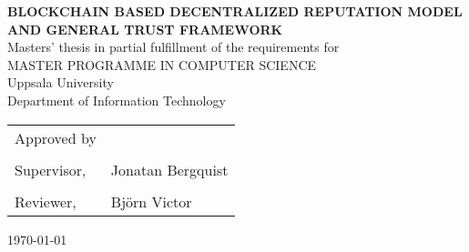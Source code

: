 
\thispagestyle{empty}

\vspace*{+5em}
\begin{center}
\textbf{BLOCKCHAIN BASED DECENTRALIZED REPUTATION MODEL AND GENERAL TRUST FRAMEWORK}\\
\vspace*{+4em}
Masters' thesis in partial fulfillment of the requirements for \\
\vspace{+2em}
MASTER PROGRAMME IN COMPUTER SCIENCE\\

\vspace*{+3em}
Uppsala University\\
Department of Information Technology\\
\vspace*{+2em}

\end{center}

\begin{tabular}{ l l }
 Approved by &   \\
  & \\
  Supervisor, & Jonatan Bergquist \\ 
  & \\
  Reviewer, & Björn Victor \\
\end{tabular}

\vspace*{+4em}

\begin{center}
\today
\end{center}

